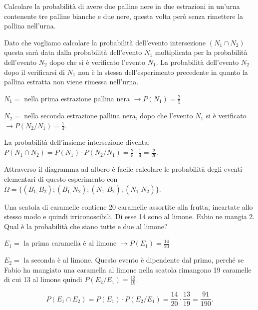 \begin{exrig}
\begin{esempio}
Calcolare la probabilità di avere due palline nere in due estrazioni in un'urna 
contenente tre palline bianche e due nere, questa volta però senza rimettere la 
pallina nell'urna.

Dato che vogliamo calcolare la probabilità dell'evento intersezione $(N_1\cap 
N_2)$ questa sarà data dalla probabilità dell'evento $N_1$ moltiplicata per la 
probabilità dell'evento $N_2$ dopo che si è verificato l'evento $N_1$. La 
probabilità dell'evento $N_2$ dopo il verificarsi di $N_1$ non è la stessa 
dell'esperimento precedente in quanto la pallina estratta non viene rimessa 
nell'urna.
\begin{itemize*}
\item $ N_{1}= $ nella prima estrazione pallina nera $\to P(N_1)=\frac 2 5$
\item$ N_{2}= $ nella seconda estrazione pallina nera, dopo che l'evento $N_1$ 
si è verificato $\to P(N_2/N_1)=\frac 1 4$.
\end{itemize*}
\newpage
\begin{center}
 
\end{center}
La probabilità dell'insieme intersezione diventa: $P(N_1\cap N_2)=P(N_1)\cdot 
P(N_2/N_1)=\frac 2 5\cdot \frac 1 4=\frac 2{20}$.

Attraverso il diagramma ad albero è facile calcolare le probabilità degli eventi 
elementari di questo esperimento con $\Omega 
=\{(B_{1,}B_2);(B_{1,}N_2);(N_{1,}B_2);(N_{1,}N_2)\}$.
\end{esempio}

\begin{esempio}
Una scatola di caramelle contiene 20 caramelle assortite alla frutta, incartate 
allo stesso modo e quindi irriconoscibili. Di esse 14 sono al limone. Fabio ne 
mangia 2. Qual è la probabilità che siano tutte e due al limone?
\begin{itemize*}
\item $E_1=$ la prima caramella è al limone $\to P(E_1)=\frac{14}{20}$
\item $E_2=$ la seconda è al limone. Questo evento è dipendente dal primo, 
perché se Fabio ha mangiato una caramella al limone nella scatola rimangono 19 
caramelle di cui 13 al limone quindi $P(E_2/E_1)=\frac{13}{19}$.
\end{itemize*}
\[P(E_1\cap E_2)=P(E_1)\cdot P(E_2/E_1)=\frac{14}{20}\cdot 
\frac{13}{19}=\frac{91}{190}.\]
\end{esempio}
\end{exrig}

